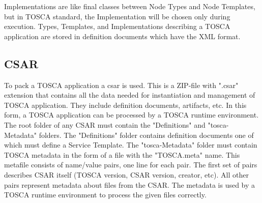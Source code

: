 Implementations are like final classes between Node Types and Node Templates, but in TOSCA standard, the Implementation will be chosen only during execution.
Types, Templates, and Implementations describing a TOSCA application are stored in definition documents which have the XML format. %

%
\subsection*{CSAR} 
%
To pack a TOSCA application a \gls{csar}\label{sec:csar} is used.
This is a ZIP-file with ".csar" extension that contains all the data needed for instantiation and management of TOSCA application.
They include definition documents, artifacts, etc.
In this form, a TOSCA application can be processed by a TOSCA runtime environment.\\
The root folder of any CSAR must contain the "Definitions" and "\gls{tosca}-Metadata" folders.
The "Definitions" folder contains definition documents one of which must define a Service Template.
The "\gls{tosca}-Metadata" folder must contain TOSCA metadata in the form of a file with the "TOSCA.meta" name.
This metafile consists of name/value pairs, one line for each pair. 
The first set of pairs describes CSAR itself (TOSCA version, CSAR version, creator, etc). 
All other pairs represent metadata about files from the CSAR. 
The metadata is used by a TOSCA runtime environment to process the given files correctly.\\
%

